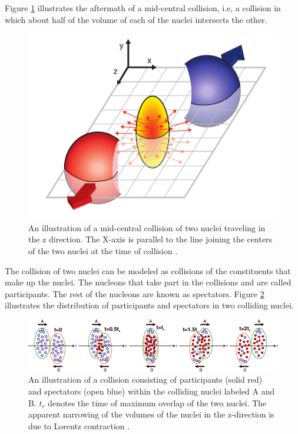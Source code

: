Figure \ref{fig:mid-central_collision} illustrates the aftermath of a mid-central collision, i.e, a collision in which about half of the volume of each of the nuclei intersects the other.%
	\begin{figure}[h]
	  \centering
	  \includegraphics[width=4.5in]{figures/flow_elliptic_init_v4.pdf}
	  \caption{An illustration of a mid-central collision of two nuclei traveling in the z direction. The X-axis is parallel to the line joining the centers of the two nuclei at the time of collision \cite{Connors:2017ptx}.}\label{fig:mid-central_collision}
	\end{figure}

The collision of two nuclei can be modeled as collisions of the constituents that make up the nuclei. The nucleons that take part in the collisions and are called participants. The rest of the nucleons are known as spectators. Figure \ref{fig:part_spec} illustrates the distribution of participants and spectators in two colliding nuclei.%
\begin{figure}[h]
  \centering
  \includegraphics[width=6.5in]{figures/part_spec_Vovchenko.png}
  \caption{An illustration of a collision consisting of participants (solid red) and spectators (open blue) within the colliding nuclei labeled A and B. $t_{c}$ denotes the time of maximum overlap of the two nuclei. The apparent narrowing of the volumes of the nuclei in the z-direction is due to Lorentz contraction \cite{PhysRevC.90.044907}.}\label{fig:part_spec}
\end{figure}


